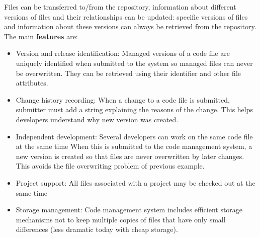 \documentclass[10pt,a4paper]{report}
\begin{document}
Files can be transferred to/from the repository, information about different versions of files and their
relationships can be updated: specific versions of files and information about these versions can always be retrieved from the repository.
The main \textbf{features} are:
\begin{itemize}
	\item Version and release identification: Managed versions of a code file are uniquely identified when submitted to the system so managed files can never be overwritten. They can be retrieved using their identifier and other file attributes.
	\item Change history recording: When a change to a code file is submitted, submitter must add a string explaining the reasons of the change. This helps developers understand why new version was created.
	\item Independent development: 	Several developers can work on the same code file at the same time
	When this is submitted to the code management system, a new version is created so that files
	are never overwritten by later changes. This avoids the file overwriting problem of previous example.
	\item Project support: 	All files associated with a project may be checked out at the same time
	\item Storage management: Code management system includes efficient storage mechanisms not to keep multiple
	copies of files that have only small differences (less dramatic today with cheap storage).
\end{itemize}
\end{document}
